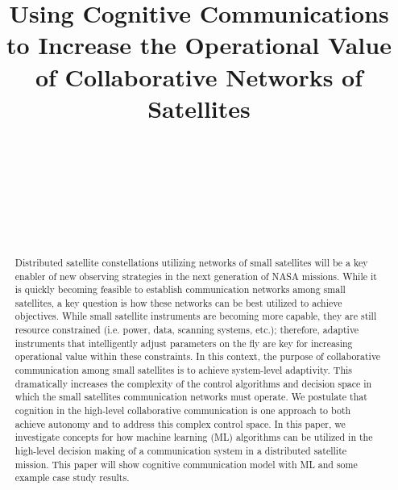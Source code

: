 \documentclass[conference]{IEEEtran}
\title{{Using Cognitive Communications to Increase the Operational Value of
    Collaborative Networks of Satellites}}
\author{
  \IEEEauthorblockN{Ryan B. Linnabary}
  \IEEEauthorblockA{\thisplace linnabary.24@osu.edu}
  \and
  \IEEEauthorblockN{Andrew J. O'Brien}
  \IEEEauthorblockA{\thisplace obrien.200@osu.edu}
  \and
  \IEEEauthorblockN{Graeme E. Smith}
  \IEEEauthorblockA{\thisplace smith.8347@osu.edu}
  \and
  \IEEEauthorblockN{Christopher Ball}
  \IEEEauthorblockA{\thisplace ball.51@osu.edu}
  \and {~} \and {~~~~~~~~~~~~~~~~~~~~~~~~~~~} \and
  \IEEEauthorblockN{Joel T. Johnson}
  \IEEEauthorblockA{\thisplace johnson.1374@osu.edu}
  \and {~~~~~~~~~~~~~~~~~~~~~~~} \and {~~~~~~~~~~~~~~~~~~~~~~}
}
\begin{document}
\maketitle



\begin{abstract}

  Distributed satellite constellations utilizing networks of small satellites will be a {\color{black} key} enabler of new observing strategies in the next generation of NASA missions.  {\color{black} While} it is quickly becoming feasible to establish communication networks among small satellites, a {\color{black} key} question is how these networks can be best utilized to achieve objectives.  {\color{black} While} small satellite instruments are becoming more capable, they are still resource constrained (i.e. power, data, scanning systems, etc.); therefore, adaptive instruments that intelligently adjust parameters on the fly are {\color{black} key} for increasing operational value within these constraints.  In this context, the purpose of collaborative communication among small satellites is to achieve system-level adaptivity.  This dramatically increases the complexity of the control algorithms and decision space in which the small satellites communication networks must operate.  We postulate that cognition in the high-level collaborative communication is one approach to both achieve autonomy and to address this complex control space.  In this paper, we investigate concepts for how machine learning (ML) algorithms can be utilized in the high-level decision making of a communication system in a distributed satellite mission.  This paper will show cognitive communication model with ML and some example case study results.

\end{abstract}
\end{document}

